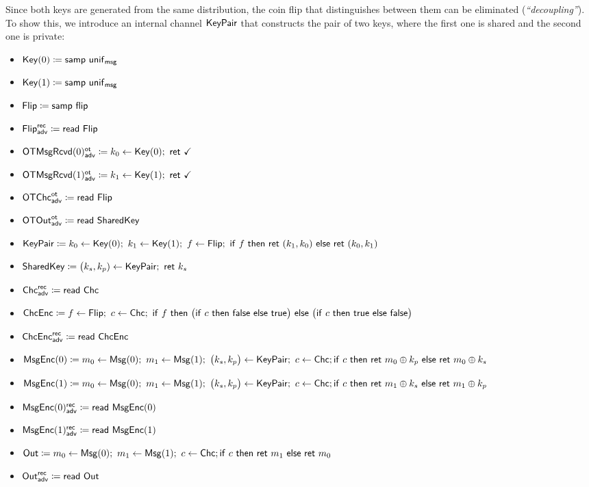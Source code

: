 \noindent Since both keys are generated from the same distribution, the coin flip that distinguishes between them can be eliminated (\emph{``decoupling''}). To show this, we introduce an internal channel $\mathsf{KeyPair}$ that constructs the pair of two keys, where the first one is shared and the second one is private:

\begin{itemize}
\item $\mathsf{Key}(0) \coloneqq \mathsf{samp} \ \mathsf{unif}_{\mathsf{msg}}$
\item $\mathsf{Key}(1) \coloneqq \mathsf{samp} \ \mathsf{unif}_{\mathsf{msg}}$
\item $\mathsf{Flip} \coloneqq \mathsf{samp} \ \mathsf{flip}$
\item {\color{blue} $\mathsf{Flip}^{\mathsf{rec}}_{\mathsf{adv}} \coloneqq \mathsf{read} \ \mathsf{Flip}$}
\item {\color{blue} $\LeakOTMsgRcvd(0)^\ot_\adv \coloneqq k_0 \leftarrow \Key(0); \ \ret{\checkmark}$}
\item {\color{blue} $\LeakOTMsgRcvd(1)^\ot_\adv \coloneqq k_1 \leftarrow \Key(1); \ \ret{\checkmark}$}
\item {\color{blue} $\mathsf{OTChc}^{\mathsf{ot}}_{\mathsf{adv}} \coloneqq \mathsf{read} \ \mathsf{Flip}$}
\item {\color{blue} $\mathsf{OTOut}^{\mathsf{ot}}_{\mathsf{adv}} \coloneqq \mathsf{read} \ \mathsf{SharedKey}$}
\item {\color{red} $\KeyPair \coloneqq k_0 \leftarrow \Key(0); \ k_1 \leftarrow \Key(1); \ f \leftarrow \Flip; \ \ifte{f}{\ret{(k_1,k_0)}}{\ret{(k_0,k_1)}}$}
\item {\color{red} $\mathsf{SharedKey} \coloneqq \big(k_s,k_p) \leftarrow \mathsf{KeyPair}; \ \mathsf{ret} \ k_s$}
\item {\color{blue} $\mathsf{Chc}^{\mathsf{rec}}_{\mathsf{adv}} \coloneqq \mathsf{read} \ \mathsf{Chc}$}
\item $\ChcEnc \coloneqq f \leftarrow \Flip; \ c \leftarrow \Chc; \ \ifte{f}{\big(\ifte{c}{\false}{\true}\big)}{\big(\ifte{c}{\true}{\false}\big)}$
\item {\color{blue} $\mathsf{ChcEnc}^{\mathsf{rec}}_{\mathsf{adv}} \coloneqq \mathsf{read} \ \mathsf{ChcEnc}$}
\item {\color{red} $\mathsf{MsgEnc}(0) \coloneqq m_0 \leftarrow \mathsf{Msg}(0); \ m_1 \leftarrow \mathsf{Msg}(1); \ \big(k_s,k_p\big) \leftarrow \mathsf{KeyPair}; \ c \leftarrow \mathsf{Chc}; \\ \mathsf{if} \ c \ \mathsf{then} \ \mathsf{ret} \ m_0 \oplus k_p \ \mathsf{else} \ \mathsf{ret} \ m_0 \oplus k_s$}
\item {\color{red} $\mathsf{MsgEnc}(1) \coloneqq m_0 \leftarrow \mathsf{Msg}(0); \ m_1 \leftarrow \mathsf{Msg}(1); \ \big(k_s,k_p\big) \leftarrow \mathsf{KeyPair}; \ c \leftarrow \mathsf{Chc}; \\ \mathsf{if} \ c \ \mathsf{then} \ \mathsf{ret} \ m_1 \oplus k_s \ \mathsf{else} \ \mathsf{ret} \ m_1 \oplus k_p$}
\item {\color{blue} $\mathsf{MsgEnc}(0)^{\mathsf{rec}}_{\mathsf{adv}} \coloneqq \mathsf{read} \ \mathsf{MsgEnc}(0)$}
\item {\color{blue} $\mathsf{MsgEnc}(1)^{\mathsf{rec}}_{\mathsf{adv}} \coloneqq \mathsf{read} \ \mathsf{MsgEnc}(1)$}
\item $\mathsf{Out} \coloneqq m_0 \leftarrow \mathsf{Msg}(0); \ m_1 \leftarrow \mathsf{Msg}(1); \ c \leftarrow \mathsf{Chc}; \\ \mathsf{if} \ c \ \mathsf{then} \ \mathsf{ret} \ m_1 \ \mathsf{else} \ \mathsf{ret} \ m_0$
\item {\color{blue} $\mathsf{Out}^{\mathsf{rec}}_{\mathsf{adv}} \coloneqq \mathsf{read} \ \mathsf{Out}$}
\end{itemize}

